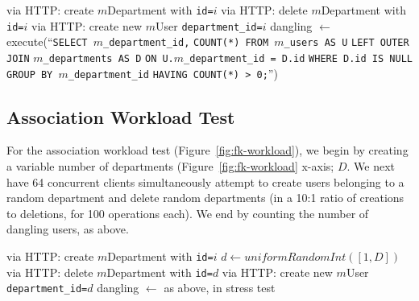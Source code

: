 \begin{algorithm}[H]
\begin{algorithmic}
    \State via HTTP: create $m$Department with \texttt{id=$i$}
  \EndFor
        \State via HTTP: delete $m$Department with \texttt{id=$i$}
      \Else
        \State via HTTP: create new $m$User \texttt{department\_id=$i$}
      \EndIf        
     \EndParFor
   \EndFor
   \State dangling $\gets $execute(``\texttt{SELECT $m$\_department\_id,}
   \State \hspace{8.5em}\texttt{COUNT(*) FROM $m$\_users AS U}
   \State \hspace{8.5em}\texttt{LEFT OUTER JOIN}
   \State \hspace{8.5em}\texttt{$m$\_departments AS D}
   \State \hspace{8.5em}\texttt{ON U.$m$\_department\_id = D.id}
   \State \hspace{8.5em}\texttt{WHERE D.id IS NULL}
   \State \hspace{8.5em}\texttt{GROUP BY $m$\_department\_id}
   \State \hspace{8.5em}\texttt{HAVING COUNT(*) > 0;}'')
\EndFor
\end{algorithmic}
\end{algorithm}

\subsection{Association Workload Test}
\label{sec:appendix-association-workload}

For the association workload test (Figure~\ref{fig:fk-workload}), we begin by creating a variable number of departments (Figure~\ref{fig:fk-workload} x-axis; $D$. We next have 64 concurrent clients simultaneously attempt to create users belonging to a random department and delete random departments (in a 10:1 ratio of creations to deletions, for 100 operations each). We end by counting the number of dangling users, as above.

\begin{algorithm}[H]
\begin{algorithmic}
    \State via HTTP: create $m$Department with \texttt{id=$i$}
  \EndFor
      \State $d \gets uniformRandomInt([1, D])$
        \State via HTTP: delete $m$Department with \texttt{id=$d$}
      \Else
        \State via HTTP: create new $m$User \texttt{department\_id=$d$}
      \EndIf        
   \EndParFor
   \State dangling $\gets $ as above, in stress test
\EndFor
\end{algorithmic}
\end{algorithm}
